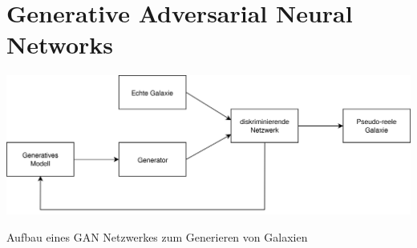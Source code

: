 \section*{Generative Adversarial Neural Networks}

\begin{center}\vspace{0.5cm}
\includegraphics[width=1\linewidth]{figs/galaxy_gan.png}
\caption{Aufbau eines GAN Netzwerkes zum Generieren von Galaxien}
\label{fig:galaxy_gan}
\end{center}\vspace{-1cm}
